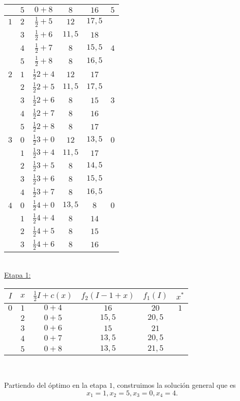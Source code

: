 \documentclass[MIOP.tex]{subfiles}
\begin{document}
\begin{solucion}
\begin{tabular}{|c| c| c| c | c| c|}
 & $5$ & $0+8$ & $8$ & $16$& $\boxed{5}$\\
\hline
\hline
$1$ & $2$ & $\frac{1}{2}+5$ & $12$  & $17,5$& \\
\hline
 & $3$ & $\frac{1}{2}+6$ &$11,5$ & $18$ &\\
\hline
 & $4$ & $\frac{1}{2}+7$ & $8$ & $15,5$& $\boxed{4}$\\
\hline
 & $5$ & $\frac{1}{2}+8$ & $8$ & $16,5$ & \\
\hline
\hline
$2$ & $1$ & $\frac{1}{2}2+4$ & $12$  & $17$& \\
\hline
 & $2$ & $\frac{1}{2}2+5$ &$11,5$ & $17,5$ &\\
\hline
 & $3$ & $\frac{1}{2}2+6$ &$8$ & $15$ &$\boxed{3}$\\
\hline
 & $4$ & $\frac{1}{2}2+7$ & $8$ & $16$&\\
\hline
 & $5$ & $\frac{1}{2}2+8$ & $8$ & $17$ & \\
\hline
\hline
$3$ & $0$ & $\frac{1}{2}3+0$ & $12$  & $13,5$ & $\boxed{0}$\\
\hline
 & $1$ & $\frac{1}{2}3+4$ &$11,5$ & $17$ &\\
\hline
 & $2$ & $\frac{1}{2}3+5$ &$8$ & $14,5$ &\\
\hline
 & $3$ & $\frac{1}{2}3+6$ & $8$ & $15,5$&\\
 \hline
 & $4$ & $\frac{1}{2}3+7$ & $8$ & $16,5$&\\
 \hline
 \hline
 $4$ & $0$ & $\frac{1}{2}4+0$ & $13,5$  & $8$& $\boxed{0}$\\
\hline
 & $1$ & $\frac{1}{2}4+4$ &$8$ & $14$ &\\
\hline
 & $2$ & $\frac{1}{2}4+5$ &$8$ & $15$ &\\
 \hline
  & $3$ & $\frac{1}{2}4+6$ &$8$ & $16$ &\\
 \hline
\end{tabular}\
\\

\underline{Etapa 1:}\

\begin{tabular}{|c| c| c| c | c| c|}
\hline
$I$ & $x$ & $\frac{1}{2}I+c(x)$ & $f_2(I-1+x)$ &  $f_1(I)$ & $x^* $ \\
\hline
$0$ & $1$ & $0+4$ &  $16$  & $20$& $\boxed{1}$ \\
\hline
 & $2$ & $0+5$ &$15,5$ & $20,5$ &\\
\hline
 & $3$ & $0+6$ & $15$ & $21$& \\
 \hline
 & $4$ & $0+7$ & $13,5$ & $20,5$& \\
 \hline
 & $5$ & $0+8$ & $13,5$ & $21,5$& \\
\hline
\end{tabular}\

Partiendo del óptimo en la etapa $1$, construimos la solución general que es
$$x_1=1,x_2=5,x_3=0,x_4=4.$$
\end{solucion}
\end{document}

